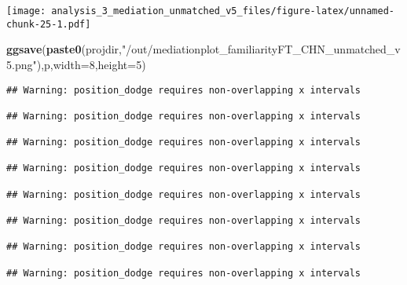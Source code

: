 \documentclass[
]{article}
\newenvironment{Shaded}{\begin{snugshade}}{\end{snugshade}}
\newcommand{\DataTypeTok}[1]{\textcolor[rgb]{0.13,0.29,0.53}{#1}}
\newcommand{\DecValTok}[1]{\textcolor[rgb]{0.00,0.00,0.81}{#1}}
\newcommand{\KeywordTok}[1]{\textcolor[rgb]{0.13,0.29,0.53}{\textbf{#1}}}
\newcommand{\NormalTok}[1]{#1}
\newcommand{\StringTok}[1]{\textcolor[rgb]{0.31,0.60,0.02}{#1}}
\begin{document}
\texttt{[image: analysis\_3\_mediation\_unmatched\_v5\_files/figure-latex/unnamed-chunk-25-1.pdf]}

\begin{Shaded}
\begin{Highlighting}[]
\KeywordTok{ggsave}\NormalTok{(}\KeywordTok{paste0}\NormalTok{(projdir,}\StringTok{"/out/mediationplot_familiarityFT_CHN_unmatched_v5.png"}\NormalTok{),p,}\DataTypeTok{width=}\DecValTok{8}\NormalTok{,}\DataTypeTok{height=}\DecValTok{5}\NormalTok{)}
\end{Highlighting}
\end{Shaded}

\begin{verbatim}
## Warning: position_dodge requires non-overlapping x intervals

## Warning: position_dodge requires non-overlapping x intervals

## Warning: position_dodge requires non-overlapping x intervals

## Warning: position_dodge requires non-overlapping x intervals

## Warning: position_dodge requires non-overlapping x intervals

## Warning: position_dodge requires non-overlapping x intervals

## Warning: position_dodge requires non-overlapping x intervals

## Warning: position_dodge requires non-overlapping x intervals
\end{verbatim}
\end{document}

